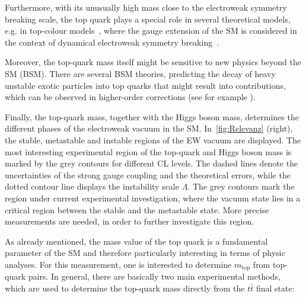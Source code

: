 Furthermore, with its unusually high mass close to the electroweak symmetry breaking scale, the top quark plays a special role in several theoretical models, e.g. in top-colour models~\cite{Hill:1991at,Hill:1994hp}, where the  gauge extension of the SM is considered in the context of dynamical electroweak symmetry breaking~\cite{Bardeen:1989ds}. 

Moreover, the top-quark mass itself might be sensitive to new physics beyond the SM (BSM). There are several BSM theories, predicting the decay of heavy unstable exotic particles into top quarks that might result into contributions, which can be observed in higher-order corrections (see for example \cite{Kong:2014jwa}).


Finally, the top-quark mass, together with the Higgs boson mass, determines the different phases of the electroweak vacuum in the SM. In~\cref{fig:Relevanz} (right), the stable, metastable and instable regions of the EW vacuum are displayed.  The most interesting experimental region of the top-quark and Higgs boson mass is marked by the grey contours for different CL levels. The dashed lines denote the uncertainties of the strong gauge coupling and the theoretical errors, while the dotted contour line displays the instability scale $\Lambda$.
The grey contours mark the region under current experimental investigation, where the vacuum state lies in a critical region between the stable and the metastable state. More precise measurements are needed, in order to further investigate this region.~\cite{Buttazzo:2013uya}



As already mentioned, the mass value of the top quark is  a fundamental parameter of the SM and therefore particularly interesting in terms of physic analyses. For this measurement, one is interested to determine $m_{\text{top}}$ from top-quark pairs. In general, there are basically two main experimental methods, which are used to determine the top-quark mass directly from the $t\bar{t}$ final state:



